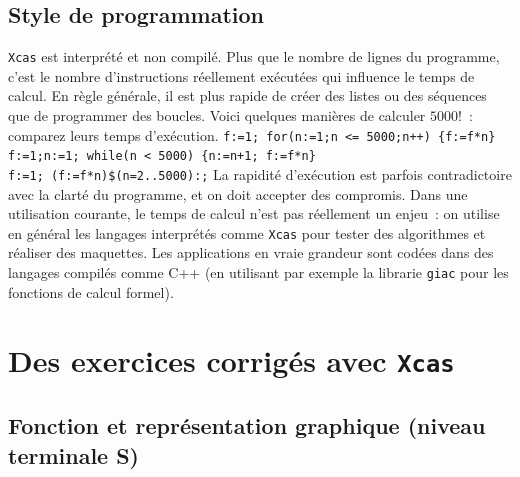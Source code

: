 \documentclass{article}
\begin{document}
\begin{giacjshere}
\subsection{Style de programmation}
%
{\tt Xcas} est interpr\'et\'e et non compil\'e.
Plus que le nombre de lignes du programme, c'est le nombre
d'instructions r\'eellement ex\'ecut\'ees qui influence le temps de calcul.
En r\`egle g\'en\'erale, il est plus rapide de cr\'eer des listes
ou des s\'equences que de programmer des boucles. 
Voici quelques mani\`eres de calculer
$5000!$~: comparez leurs temps d'ex\'ecution.
\verb|f:=1; for(n:=1;n <= 5000;n++) {f:=f*n}|\\
\verb|f:=1;n:=1; while(n < 5000) {n:=n+1; f:=f*n}|\\
\verb|f:=1; (f:=f*n)$(n=2..5000):;|
La rapidit\'e d'ex\'ecution est parfois contradictoire avec la
clart\'e du programme, et on doit accepter des compromis. Dans une
utilisation courante, le temps de calcul n'est pas r\'eellement un enjeu~: 
on utilise en g\'en\'eral les langages
interpr\'et\'es comme {\tt Xcas} pour tester des algorithmes et r\'ealiser des
maquettes. Les applications en vraie grandeur sont cod\'ees dans des
langages compil\'es comme C++ (en utilisant par exemple la librarie
\verb|giac| pour les fonctions de calcul formel).

\pagebreak

\section{Des exercices corrig\'es avec {\tt Xcas}}

\subsection{Fonction et repr\'esentation graphique (niveau terminale S)}


\end{giacjshere}
\end{document}
